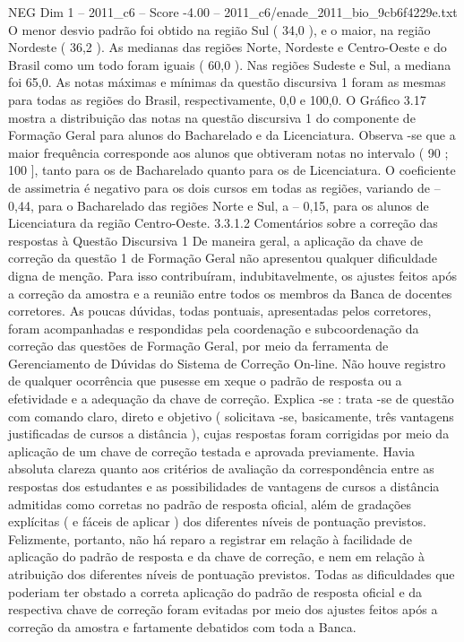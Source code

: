 \begin{textsample}{NEG Dim 1 – 2011\_c6 – Score -4.00 – 2011\_c6/enade\_2011\_bio\_9cb6f4229e.txt}
O menor desvio padrão foi obtido na região Sul ( 34,0 ), e o maior, na região Nordeste ( 36,2 ).
As medianas das regiões Norte, Nordeste e Centro-Oeste e do Brasil como um todo foram iguais ( 60,0 ).
Nas regiões Sudeste e Sul, a mediana foi 65,0.
As notas máximas e mínimas da questão discursiva 1 foram as mesmas para todas as regiões do Brasil, respectivamente, 0,0 e 100,0.
O Gráfico 3.17 mostra a distribuição das notas na questão discursiva 1 do componente de Formação Geral para alunos do Bacharelado e da Licenciatura.
Observa -se que a maior frequência corresponde aos alunos que obtiveram notas no intervalo ( 90 ; 100 ], tanto para os de Bacharelado quanto para os de Licenciatura.
O coeficiente de assimetria é negativo para os dois cursos em todas as regiões, variando de – 0,44, para o Bacharelado das regiões Norte e Sul, a – 0,15, para os alunos de Licenciatura da região Centro-Oeste. 3.3.1.2 Comentários sobre a correção das respostas à Questão Discursiva 1 De maneira geral, a aplicação da chave de correção da questão 1 de Formação Geral não apresentou qualquer dificuldade digna de menção.
Para isso contribuíram, indubitavelmente, os ajustes feitos após a correção da amostra e a reunião entre todos os membros da Banca de docentes corretores.
As poucas dúvidas, todas pontuais, apresentadas pelos corretores, foram acompanhadas e respondidas pela coordenação e subcoordenação da correção das questões de Formação Geral, por meio da ferramenta de Gerenciamento de Dúvidas do Sistema de Correção On-line.
Não houve registro de qualquer ocorrência que pusesse em xeque o padrão de resposta ou a efetividade e a adequação da chave de correção.
Explica -se : trata -se de questão com comando claro, direto e objetivo ( solicitava -se, basicamente, três vantagens justificadas de cursos a distância ), cujas respostas foram corrigidas por meio da aplicação de um chave de correção testada e aprovada previamente.
Havia absoluta clareza quanto aos critérios de avaliação da correspondência entre as respostas dos estudantes e as possibilidades de vantagens de cursos a distância admitidas como corretas no padrão de resposta oficial, além de gradações explícitas ( e fáceis de aplicar ) dos diferentes níveis de pontuação previstos.
Felizmente, portanto, não há reparo a registrar em relação à facilidade de aplicação do padrão de resposta e da chave de correção, e nem em relação à atribuição dos diferentes níveis de pontuação previstos.
Todas as dificuldades que poderiam ter obstado a correta aplicação do padrão de resposta oficial e da respectiva chave de correção foram evitadas por meio dos ajustes feitos após a correção da amostra e fartamente debatidos com toda a Banca.

\end{textsample}
